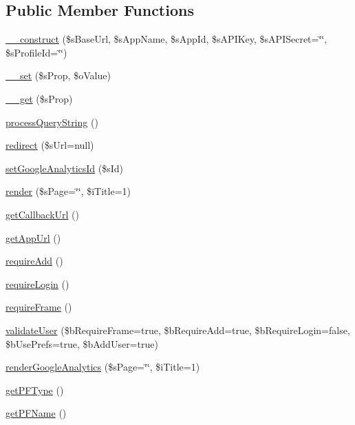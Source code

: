 \subsection*{Public Member Functions}
\begin{DoxyCompactItemize}
\item 
\hyperlink{classSF__Platform_a910390410dc3e516f9323bebf27d57a8}{\_\-\_\-construct} (\$sBaseUrl, \$sAppName, \$sAppId, \$sAPIKey, \$sAPISecret=\char`\"{}\char`\"{}, \$sProfileId=\char`\"{}\char`\"{})
\item 
\hyperlink{classSF__Platform_a9ad3d2905b2a50dfbee6d5f473e758a9}{\_\-\_\-set} (\$sProp, \$oValue)
\item 
\hyperlink{classSF__Platform_a9519b5bba407a1a89f324fcc7f26c0e2}{\_\-\_\-get} (\$sProp)
\item 
\hyperlink{classSF__Platform_aa40909289ffd00ccc071d938f586fc47}{processQueryString} ()
\item 
\hyperlink{classSF__Platform_a672e5a73f1b59609d6530926f0c90568}{redirect} (\$sUrl=null)
\item 
\hyperlink{classSF__Platform_ae081ea719cf453b879942b2167d22457}{setGoogleAnalyticsId} (\$sId)
\item 
\hyperlink{classSF__Platform_ac3b978d82ece5ad68f6a1eacef1fb04c}{render} (\$sPage=\char`\"{}\char`\"{}, \$iTitle=1)
\item 
\hyperlink{classSF__Platform_a10b40817a4c75a202a41511d31629e6c}{getCallbackUrl} ()
\item 
\hyperlink{classSF__Platform_aec474172017ccece67a1c46e1a5a3460}{getAppUrl} ()
\item 
\hyperlink{classSF__Platform_a2104a9897a2bd81518382cb07a0b41cf}{requireAdd} ()
\item 
\hyperlink{classSF__Platform_a8279b755615299d23d0989e9330ea638}{requireLogin} ()
\item 
\hyperlink{classSF__Platform_a2f3c6eb30cc80a28261ed06074224f12}{requireFrame} ()
\item 
\hyperlink{classSF__Platform_a18a992b92ee5ff3ad60ec30d8e0cba60}{validateUser} (\$bRequireFrame=true, \$bRequireAdd=true, \$bRequireLogin=false, \$bUsePrefs=true, \$bAddUser=true)
\item 
\hyperlink{classSF__Platform_ab5bf72330191aff91d12b6cee65d5e14}{renderGoogleAnalytics} (\$sPage=\char`\"{}\char`\"{}, \$iTitle=1)
\item 
\hyperlink{classSF__Platform_a3606743752a94277695713e909058e13}{getPFType} ()
\item 
\hyperlink{classSF__Platform_ae54fd14fc0c3886a038431868ac4fbc7}{getPFName} ()

\end{DoxyCompactItemize}
